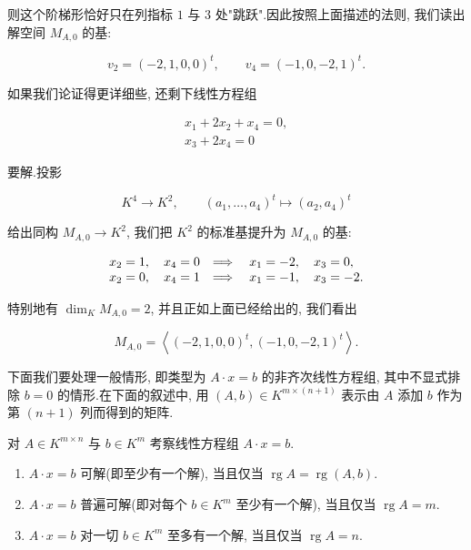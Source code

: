 则这个阶梯形恰好只在列指标 $1$ 与 $3$ 处"跳跃".因此按照上面描述的法则, 我们读出解空间 $M_{A, 0}$ 的基:

\[
v_2 = (-2, 1, 0, 0)^t, \qquad v_4 = (-1, 0, -2, 1)^t\text{.}
\]

如果我们论证得更详细些, 还剩下线性方程组

\[
\begin{array}{c}
x_1 + 2x_2 + x_4 = 0, \\
x_3 + 2x_4 = 0
\end{array}
\]

要解.投影

\[
K^4 \longrightarrow K^2, \qquad (a_1, \ldots, a_4)^t \longmapsto (a_2, a_4)^t
\]

给出同构 $M_{A, 0} \longrightarrow K^2$, 我们把 $K^2$ 的标准基提升为 $M_{A, 0}$ 的基:

\[
\begin{array}{l l}
x_2 = 1, \quad x_4 = 0 & \Longrightarrow \quad x_1 = -2, \quad x_3 = 0, \\
x_2 = 0, \quad x_4 = 1 & \Longrightarrow \quad x_1 = -1, \quad x_3 = -2\text{.}
\end{array}
\]

特别地有 $\dim_K M_{A, 0} = 2$, 并且正如上面已经给出的, 我们看出

\[
M_{A, 0} = \left\langle (-2, 1, 0, 0)^t, (-1, 0, -2, 1)^t \right\rangle\text{.}
\]

下面我们要处理一般情形, 即类型为 $A \cdot x = b$ 的非齐次线性方程组, 其中不显式排除 $b = 0$ 的情形.在下面的叙述中, 用 $(A, b) \in K^{m \times (n + 1)}$ 表示由 $A$ 添加 $b$ 作为第 $(n + 1)$ 列而得到的矩阵.

\begin{theorem}\label{thm:3.5.5}
对 $A \in K^{m \times n}$ 与 $b \in K^m$ 考察线性方程组 $A \cdot x = b$.
\begin{enumerate}
\item[(i)] $A \cdot x = b$ 可解(即至少有一个解), 当且仅当 $\operatorname{rg} A = \operatorname{rg}(A, b)$.
\item[(ii)] $A \cdot x = b$ 普遍可解(即对每个 $b \in K^m$ 至少有一个解), 当且仅当 $\operatorname{rg} A = m$.
\item[(iii)] $A \cdot x = b$ 对一切 $b \in K^m$ 至多有一个解, 当且仅当 $\operatorname{rg} A = n$.
\end{enumerate}
\end{theorem}

